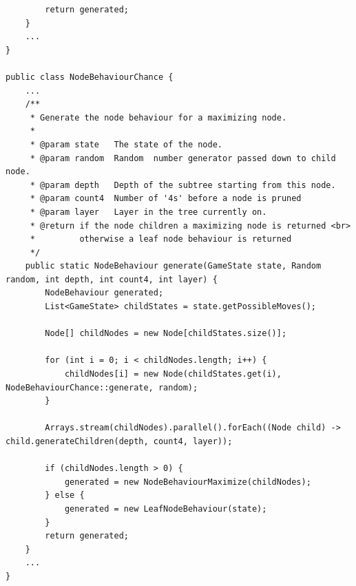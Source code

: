 \documentclass{article}
\begin{document}
\begin{verbatim}
        return generated;
    }
    ...
}

public class NodeBehaviourChance {
    ...
    /**
     * Generate the node behaviour for a maximizing node.
     *
     * @param state   The state of the node.
     * @param random  Random  number generator passed down to child node.
     * @param depth   Depth of the subtree starting from this node.
     * @param count4  Number of '4s' before a node is pruned
     * @param layer   Layer in the tree currently on.
     * @return if the node children a maximizing node is returned <br>
     *         otherwise a leaf node behaviour is returned
     */
    public static NodeBehaviour generate(GameState state, Random random, int depth, int count4, int layer) {
        NodeBehaviour generated;
        List<GameState> childStates = state.getPossibleMoves();

        Node[] childNodes = new Node[childStates.size()];

        for (int i = 0; i < childNodes.length; i++) {
            childNodes[i] = new Node(childStates.get(i), NodeBehaviourChance::generate, random);
        }

        Arrays.stream(childNodes).parallel().forEach((Node child) -> child.generateChildren(depth, count4, layer));

        if (childNodes.length > 0) {
            generated = new NodeBehaviourMaximize(childNodes);
        } else {
            generated = new LeafNodeBehaviour(state);
        }
        return generated;
    }
    ...
}
\end{verbatim}
\end{document}

